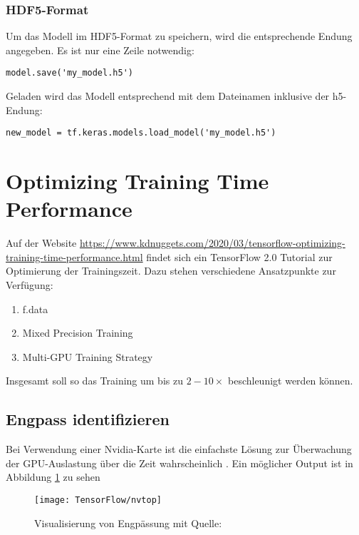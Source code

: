 \subsubsection{HDF5-Format}
Um das Modell im HDF5-Format zu speichern, wird die entsprechende Endung angegeben. Es ist nur eine Zeile notwendig:

\begin{verbatim}
model.save('my_model.h5')
\end{verbatim}

Geladen wird das Modell entsprechend mit dem Dateinamen inklusive der h5-Endung:

\begin{verbatim}
new_model = tf.keras.models.load_model('my_model.h5')
\end{verbatim}

\section{Optimizing Training Time Performance}

Auf der Website 
\url{https://www.kdnuggets.com/2020/03/tensorflow-optimizing-training-time-performance.html}
findet sich ein TensorFlow 2.0 Tutorial zur Optimierung der Trainingszeit.
Dazu stehen verschiedene Ansatzpunkte zur Verfügung:

\begin{enumerate}
\item f.data
\item Mixed Precision Training
\item Multi-GPU Training Strategy
\end{enumerate}
Insgesamt soll so das Training um bis zu $2-10 \times$ beschleunigt werden können. \cite{KDnuggets.11.12.2020}
 
\subsection{Engpass identifizieren}
Bei Verwendung einer Nvidia-Karte ist die einfachste Lösung zur Überwachung der GPU-Auslastung über die Zeit wahrscheinlich 
. Ein möglicher Output ist in Abbildung \ref{Fignvtop} zu sehen 

\begin{figure}[H]
	\begin{center}
		\texttt{[image: TensorFlow/nvtop]}
		\caption{Visualisierung von Engpässung mit  Quelle:\cite{KDnuggets.11.12.2020}} 
		\label{Fignvtop}
	\end{center}
\end{figure}

